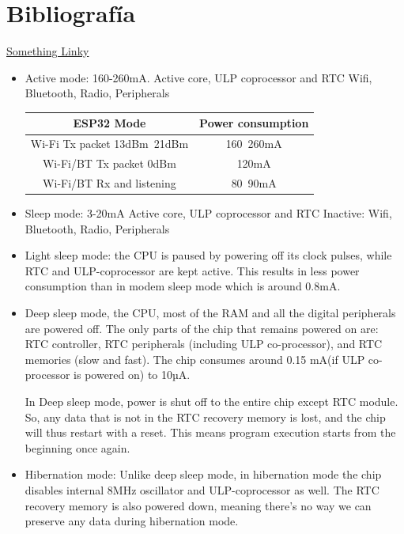 \documentclass[a4paper ,12pt, onecolumn]{article}
\begin{document}
\section{Bibliografía}
\href{https://campus.masterd.es/campusvirtual/index.htm}{Something Linky} 
\begin{itemize}
    \item  Active mode: 160-260mA.  Active core, ULP coprocessor and RTC
     Wifi, Bluetooth, Radio, Peripherals
    \begin{center}
        \begin{tabular}{||c | c ||} 
        \hline
        ESP32 Mode & Power consumption  \\ [0.5ex] 
        \hline\hline
        Wi-Fi Tx packet 13dBm~21dBm & 160~260mA  \\ 
        \hline
        Wi-Fi/BT Tx packet 0dBm	 & 120mA  \\
        \hline
        Wi-Fi/BT Rx and listening & 80~90mA  \\
        \hline
       \end{tabular}
       \end{center}
    \item  Sleep mode: 3-20mA Active core, ULP coprocessor and RTC
    Inactive: Wifi, Bluetooth, Radio, Peripherals
    \item  Light sleep mode: the CPU is paused by powering off its clock 
    pulses, while RTC and ULP-coprocessor are kept active. This results in 
    less power consumption than in modem sleep mode which is around 0.8mA.

    \item Deep sleep mode, the CPU, most of the RAM and all the digital 
    peripherals are powered off. The only parts of the chip that remains 
    powered on are: RTC controller, RTC peripherals (including ULP 
    co-processor), and RTC memories (slow and fast).
    The chip consumes around 0.15 mA(if ULP co-processor is powered on) to 10µA.

    In Deep sleep mode, power is shut off to the entire chip except RTC module. So, any data that is not in the RTC recovery memory is lost, and the chip will thus restart with a reset. This means program execution starts from the beginning once again.

    \item Hibernation mode: Unlike deep sleep mode, in hibernation mode the chip disables internal 8MHz oscillator and ULP-coprocessor as well. The RTC recovery memory is also powered down, meaning there’s no way we can preserve any data during hibernation mode.


\end{itemize}
\end{document}
